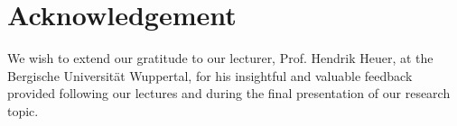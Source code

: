 \documentclass[manuscript,review]{acmart}
\begin{document}
\section{Acknowledgement}
We wish to extend our gratitude to our lecturer, Prof. Hendrik Heuer, at the Bergische Universität Wuppertal, for 
his insightful and valuable feedback provided following our lectures and during the final presentation of our research topic.



\end{document}
